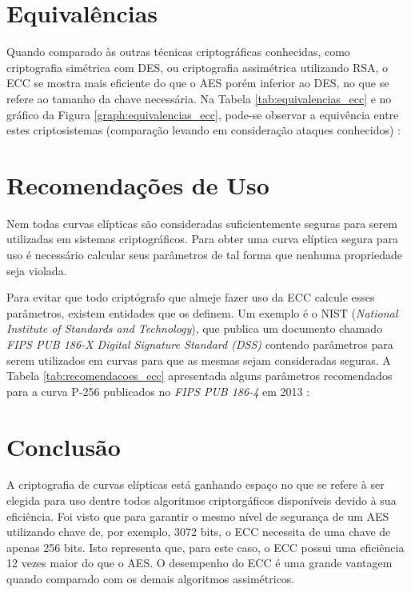 \documentclass[12pt]{article}
\begin{document}
    \section{Equivalências}
    \label{sec:equivalencias}
    
        Quando comparado às outras técnicas criptográficas conhecidas, como criptografia simétrica com DES, ou criptografia assimétrica utilizando RSA, o ECC se mostra mais eficiente do que o AES porém inferior ao DES, no que se refere ao tamanho da chave necessária. Na Tabela \ref{tab:equivalencias_ecc} e no gráfico da Figura \ref{graph:equivalencias_ecc}, pode-se observar a equivência entre estes criptosistemas (comparação levando em consideração ataques conhecidos) \cite{dahab2000overview}:

        

        

    \section{Recomendações de Uso}
    \label{sec:recomendacoes}

        Nem todas curvas elípticas são consideradas suficientemente seguras para serem utilizadas em sistemas criptográficos. Para obter uma curva elíptica segura para uso é necessário calcular seus parâmetros de tal forma que nenhuma propriedade seja violada.

        Para evitar que todo criptógrafo que almeje fazer uso da ECC calcule esses parâmetros, existem entidades que os definem. Um exemplo é o NIST (\textit{National Institute of Standards and Technology}), que publica um documento chamado \textit{FIPS PUB 186-X Digital Signature Standard (DSS)} contendo parâmetros para serem utilizados em curvas para que as mesmas sejam consideradas seguras. A Tabela \ref{tab:recomendacoes_ecc} apresentada alguns parâmetros recomendados para a curva P-256 publicados no \textit{FIPS PUB 186-4} em 2013 \cite{nist2013fipspub186}:

        

    \section{Conclusão}
    \label{sec:conclusão}

        A criptografia de curvas elípticas está ganhando espaço no que se refere à ser elegida para uso dentre todos algoritmos criptorgáficos disponíveis devido à sua eficiência. Foi visto que para garantir o mesmo nível de segurança de um AES utilizando chave de, por exemplo, 3072 bits, o ECC necessita de uma chave de apenas 256 bits. Isto representa que, para este caso, o ECC possui uma eficiência 12 vezes maior do que o AES. O desempenho do ECC é uma grande vantagem quando comparado com os demais algoritmos assimétricos.
\end{document}
